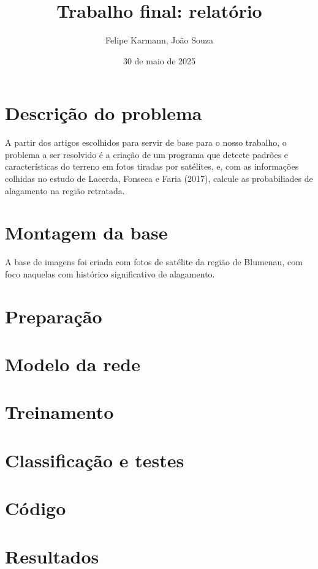 \documentclass{article}
\author{Felipe Karmann, João Souza}
\date{30 de maio de 2025}
\title{Trabalho final: relatório}
\begin{document}
\maketitle

\section{Descrição do problema}

A partir dos artigos escolhidos para servir de base para o nosso trabalho, o problema a ser resolvido é a criação de um programa que detecte padrões e características do terreno em fotos tiradas por satélites, e, com as informações colhidas no estudo de Lacerda, Fonseca e Faria (2017), calcule as probabiliades de alagamento na região retratada.

\section{Montagem da base}

A base de imagens foi criada com fotos de satélite da região de Blumenau, com foco naquelas com histórico significativo de alagamento.

\section{Preparação}

\section{Modelo da rede}

\section{Treinamento}

\section{Classificação e testes}

\section{Código}

\section{Resultados}
\end{document}
